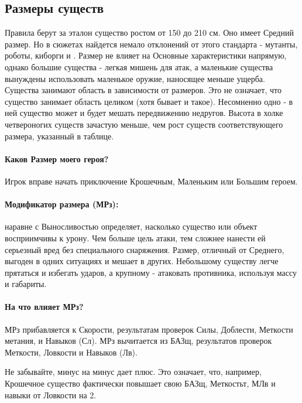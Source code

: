 \subsection{Размеры существ}
Правила берут за эталон существо ростом от 150 до 210 см. Оно имеет Средний размер. Но в сюжетах найдется немало отклонений от этого стандарта - мутанты, роботы, киборги и \tbd.
\newline Размер не влияет на Основные характеристики напрямую, однако большие существа - легкая мишень для атак, а маленькие существа вынуждены использовать маленькое оружие, наносящее меньше ущерба.
\newline Существа занимают область в зависимости от размеров. Это не означает, что существо занимает область целиком (хотя бывает и такое). Несомненно одно - в ней существо может и будет мешать передвижению недругов.
\newline Высота в холке четвероногих существ зачастую меньше, чем рост существ соответствующего размера, указанный в таблице.

\paragraph{Каков Размер моего героя?} Игрок вправе начать приключение Крошечным, Маленьким или Большим героем. 

\paragraph{Модификатор размера (МРз):} наравне с Выносливостью определяет, насколько существо или объект восприимчивы к урону. Чем больше цель атаки, тем сложнее нанести ей серьезный вред без специального снаряжения.
\newline Размер, отличный от Среднего, выгоден в одних ситуациях и мешает в других. Небольшому существу легче прятаться и избегать ударов, а крупному - атаковать противника, используя массу и габариты. 
\paragraph{На что влияет МРз?} МРз прибавляется к Скорости, результатам проверок Силы, Доблести, Меткости метания, и Навыков (Сл).
\newline МРз вычитается из БАЗщ, результатов проверок Меткости, Ловкости и Навыков (Лв).
\begin{tcolorbox}
    Не забывайте, минус на минус дает плюс. Это означает, что, например, Крошечное существо фактически повышает свою БАЗщ, Меткостьт, МЛв и навыки от Ловкости на 2.
\end{tcolorbox}

